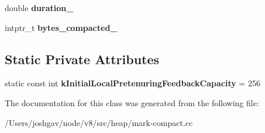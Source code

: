 \begin{DoxyCompactItemize}
\item 
double {\bfseries duration\+\_\+}\hypertarget{classv8_1_1internal_1_1_mark_compact_collector_1_1_evacuator_a823e2bdd8f0375a23ebd68281a1b3623}{}\label{classv8_1_1internal_1_1_mark_compact_collector_1_1_evacuator_a823e2bdd8f0375a23ebd68281a1b3623}

\item 
intptr\+\_\+t {\bfseries bytes\+\_\+compacted\+\_\+}\hypertarget{classv8_1_1internal_1_1_mark_compact_collector_1_1_evacuator_a244610b0da2db44ba5889524ccc4042e}{}\label{classv8_1_1internal_1_1_mark_compact_collector_1_1_evacuator_a244610b0da2db44ba5889524ccc4042e}

\end{DoxyCompactItemize}
\subsection*{Static Private Attributes}
\begin{DoxyCompactItemize}
\item 
static const int {\bfseries k\+Initial\+Local\+Pretenuring\+Feedback\+Capacity} = 256\hypertarget{classv8_1_1internal_1_1_mark_compact_collector_1_1_evacuator_a31f7a98cc8d3e4cec4e9ec783d6c0ac1}{}\label{classv8_1_1internal_1_1_mark_compact_collector_1_1_evacuator_a31f7a98cc8d3e4cec4e9ec783d6c0ac1}

\end{DoxyCompactItemize}


The documentation for this class was generated from the following file\+:\begin{DoxyCompactItemize}
\item 
/\+Users/joshgav/node/v8/src/heap/mark-\/compact.\+cc\end{DoxyCompactItemize}

